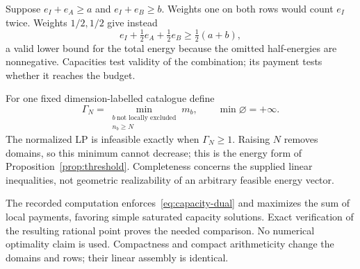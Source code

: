 \begin{example*}
Suppose $e_I+e_A\ge a$ and $e_I+e_B\ge b$. Weights one on both rows
would count $e_I$ twice. Weights $1/2,1/2$ give instead
\[
           e_I+\tfrac12e_A+\tfrac12e_B\ge\tfrac12(a+b),
\]
a valid lower bound for the total energy because the omitted
half-energies are nonnegative. Capacities test validity of the
combination; its payment tests whether it reaches the budget.
\end{example*}

For one fixed dimension-labelled catalogue define
\begin{equation}\label{eq:threshold-energy-value}
 \Gamma_N=\min_{\substack{b\ \text{not locally excluded}\\ n_b\ge N}}m_b,
 \qquad\min\varnothing=+\infty.
\end{equation}
The normalized LP is infeasible exactly when $\Gamma_N\ge1$.
Raising $N$ removes domains, so this minimum cannot decrease; this
is the energy form of Proposition~\ref{prop:threshold}.
Completeness concerns the supplied linear inequalities, not geometric
realizability of an arbitrary feasible energy vector.

The recorded computation enforces~\eqref{eq:capacity-dual} and
maximizes the sum of local payments, favoring simple saturated
capacity solutions. Exact verification of the resulting rational
point proves the needed comparison. No numerical optimality claim
is used. Compactness and compact arithmeticity change the domains
and rows; their linear assembly is identical.
